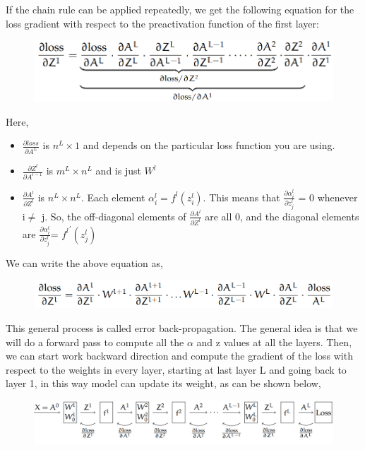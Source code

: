 If  the chain rule can be applied repeatedly, we get the following equation for the loss gradient  with respect to the preactivation function of the first layer:
\begin{figure}[H]
    \centering
    \includegraphics[scale=0.3]{Figure/ml__8.png}
    \label{fig:my_label}
\end{figure}


Here,
\begin{itemize}
    \item $\frac{\partial loss}{\partial A^L}$ is $n^L \times 1$ and depends on the particular loss function you are using.
    \item $\frac{\partial Z^l}{\partial A^{l-1}}$ is $m^L \times n^L$ and is just $W^l$
    \item $\frac{\partial A^l}{\partial Z^l}$ is $n^L \times n^L$. Each element $\alpha_i ^l = f^l(z_i ^l)$. This means that $\frac{\partial \alpha_i ^l}{\partial z_j ^l}$ = 0 whenever i$\neq$ j. So, the off-diagonal elements of $\frac{\partial A^l}{\partial Z^l}$ are all 0, and the diagonal elements are $\frac{\partial \alpha_i ^l}{\partial z_j ^l}$= ${f^l}^'(z_j ^l)$
\end{itemize}
We can write the above equation as,
\begin{figure}[H]
    \centering
    \includegraphics[scale=0.3]{Figure/ml__09.png}
    \label{fig:my_label}
\end{figure}

This general process is called error back-propagation. The general idea is that we will do a forward
pass to compute all the $\alpha$ and z values at all the layers. Then, we can start work backward direction and compute the gradient of the loss with respect
to the weights in every layer, starting at last layer L and going back to layer 1, in this way model can update its weight, as can be shown below,\\
\begin{figure}[H]
    \centering
    \includegraphics[scale=0.3]{Figure/ml__10.png}
    \label{fig:my_label}
\end{figure}





